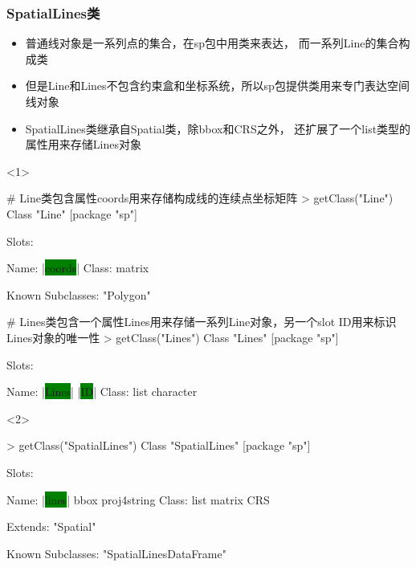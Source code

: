 \subsubsection{SpatialLines类}
\begin{frame}[t,fragile]{\subsecname}{\subsubsecname}
\begin{itemize}
\item<1-> 普通线对象是一系列点的集合，在sp包中用类来表达，
而一系列Line的集合构成类
\item<2-> 但是Line和Lines不包含约束盒和坐标系统，所以sp包提供类用来专门表达空间线对象
\item<2-> SpatialLines类继承自Spatial类，除bbox和CRS之外，
还扩展了一个list类型的属性用来存储Lines对象
\end{itemize}

\begin{overlayarea}{\textwidth}{\textheight}
\begin{onlyenv}<1>
\begin{rcode}
# Line类包含属性coords用来存储构成线的连续点坐标矩阵
> getClass("Line")
Class "Line" [package "sp"]

Slots:
             
Name:  |\colorbox{green}{coords}|
Class: matrix

Known Subclasses: "Polygon"

# Lines类包含一个属性Lines用来存储一系列Line对象，另一个slot ID用来标识Lines对象的唯一性
> getClass("Lines")
Class "Lines" [package "sp"]

Slots:
                          
Name:      |\colorbox{green}{Lines}|        |\colorbox{green}{ID}|
Class:      list character
\end{rcode}
\end{onlyenv}

\begin{onlyenv}<2>
\begin{rcode}
> getClass("SpatialLines")
Class "SpatialLines" [package "sp"]

Slots:
                                          
Name:        |\colorbox{green}{lines}|        bbox proj4string
Class:        list      matrix         CRS

Extends: "Spatial"

Known Subclasses: "SpatialLinesDataFrame"
\end{rcode}
\end{onlyenv}
\end{overlayarea}
\end{frame}

